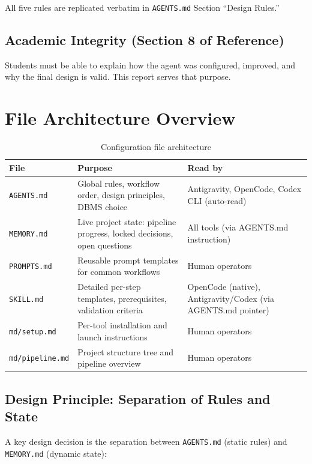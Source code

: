 \documentclass[12pt,a4paper]{article}
\begin{document}
All five rules are replicated verbatim in \texttt{AGENTS.md} Section ``Design Rules.''

\subsection{Academic Integrity (Section 8 of Reference)}

Students must be able to explain how the agent was configured, improved, and why the final design is valid. This report serves that purpose.

\section{File Architecture Overview}

\begin{table}[h]
\centering
\begin{tabular}{|l|p{4.5cm}|p{4.5cm}|}
\hline
\textbf{File} & \textbf{Purpose} & \textbf{Read by} \\
\hline
\texttt{AGENTS.md} & Global rules, workflow order, design principles, DBMS choice & Antigravity, OpenCode, Codex CLI (auto-read) \\
\hline
\texttt{MEMORY.md} & Live project state: pipeline progress, locked decisions, open questions & All tools (via AGENTS.md instruction) \\
\hline
\texttt{PROMPTS.md} & Reusable prompt templates for common workflows & Human operators \\
\hline
\texttt{SKILL.md} & Detailed per-step templates, prerequisites, validation criteria & OpenCode (native), Antigravity/Codex (via AGENTS.md pointer) \\
\hline
\texttt{md/setup.md} & Per-tool installation and launch instructions & Human operators \\
\hline
\texttt{md/pipeline.md} & Project structure tree and pipeline overview & Human operators \\
\hline
\end{tabular}
\caption{Configuration file architecture}
\end{table}

\subsection{Design Principle: Separation of Rules and State}

A key design decision is the separation between \texttt{AGENTS.md} (static rules) and \texttt{MEMORY.md} (dynamic state):
\end{document}
